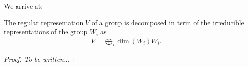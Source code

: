We arrive at:
\begin{theorem}
	The regular representation $V$ of a group is decomposed in term of the irreducible representations of the group $W_i$ as
	\begin{align*}
		V = \bigoplus_i \dim (W_i) W_i.
	\end{align*}
\end{theorem}

\begin{proof}
	\textit{To be written...}
\end{proof}

%
%
%
%
%
%	
